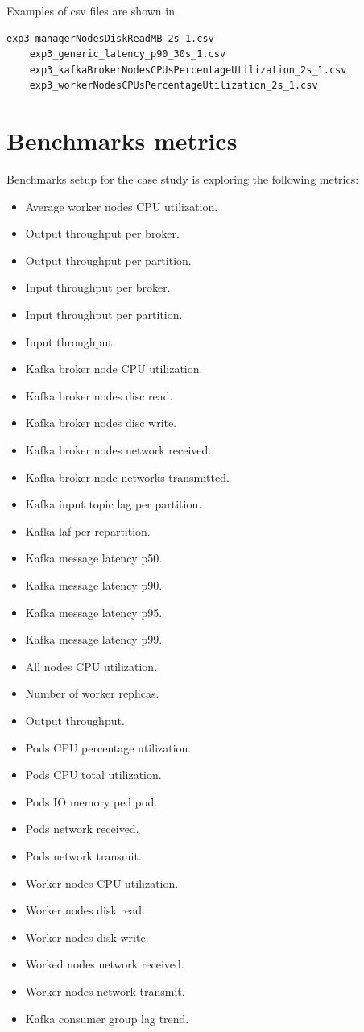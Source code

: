 Examples of csv files are shown in

\begin{lstlisting}[label={lst:bench-csv-files}]
    exp3_managerNodesDiskReadMB_2s_1.csv
    exp3_generic_latency_p90_30s_1.csv
    exp3_kafkaBrokerNodesCPUsPercentageUtilization_2s_1.csv
    exp3_workerNodesCPUsPercentageUtilization_2s_1.csv
\end{lstlisting}


\section{Benchmarks metrics}\label{sec:benchmarks-metrics}
Benchmarks setup for the case study is exploring the following metrics:

\begin{itemize}
    \item Average worker nodes CPU utilization.
    \item Output throughput per broker.
    \item Output throughput per partition.
    \item Input throughput per broker.
    \item Input throughput per partition.
    \item Input throughput.
    \item Kafka broker node CPU utilization.
    \item Kafka broker nodes disc read.
    \item Kafka broker nodes disc write.
    \item Kafka broker nodes network received.
    \item Kafka broker node networks transmitted.
    \item Kafka input topic lag per partition.
    \item Kafka laf per repartition.
    \item Kafka message latency p50.
    \item Kafka message latency p90.
    \item Kafka message latency p95.
    \item Kafka message latency p99.
    \item All nodes CPU utilization.
    \item Number of worker replicas.
    \item Output throughput.
    \item Pods CPU percentage utilization.
    \item Pods CPU total utilization.
    \item Pods IO memory ped pod.
    \item Pods network received.
    \item Pods network transmit.
    \item Worker nodes CPU utilization.
    \item Worker nodes disk read.
    \item Worker nodes disk write.
    \item Worked nodes network received.
    \item Worker nodes network transmit.
    \item Kafka consumer group lag trend.
\end{itemize}

